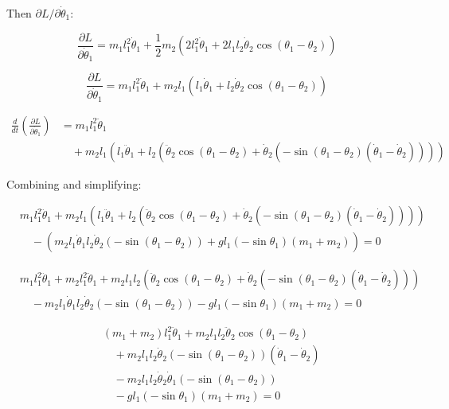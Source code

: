 \documentclass[11pt,a4paper]{article}
\begin{document}
Then $\partial L / \partial \dot{\theta}_1$:

\[ \frac{\partial L}{\partial \dot{\theta}_1} = m_1 l_1^2 \dot{\theta}_1 + \frac{1}{2} m_2 \left( 2 l_1^2 \dot{\theta}_1 + 2 l_1 l_2 \dot{\theta}_2 \cos(\theta_1 - \theta_2) \right) \]

\[ \frac{\partial L}{\partial \dot{\theta}_1} = m_1 l_1^2 \dot{\theta}_1 + m_2 l_1 \left( l_1 \dot{\theta}_1 + l_2 \dot{\theta}_2 \cos(\theta_1 - \theta_2) \right) \]

\begin{align*}
\frac{d}{dt} \left( \frac{\partial L}{\partial \dot{\theta}_1} \right)
  &= m_1 l_1^2 \ddot{\theta}_1 \\
  &\quad + m_2 l_1 \left( l_1 \ddot{\theta}_1 + l_2 \left( \ddot{\theta}_2 \cos(\theta_1 - \theta_2) + \dot{\theta}_2 (-\sin(\theta_1 - \theta_2) (\dot{\theta}_1 - \dot{\theta}_2)) \right) \right)
\end{align*}

Combining and simplifying:

\begin{align*}
& m_1 l_1^2 \ddot{\theta}_1 + m_2 l_1 \left( l_1 \ddot{\theta}_1 + l_2 \left( \ddot{\theta}_2 \cos(\theta_1 - \theta_2) + \dot{\theta}_2 (-\sin(\theta_1 - \theta_2) (\dot{\theta}_1 - \dot{\theta}_2)) \right) \right) \\
&\quad - \left( m_2 l_1 \dot{\theta}_1 l_2 \dot{\theta}_2 (-\sin(\theta_1 - \theta_2)) + g l_1 (-\sin\theta_1) (m_1 + m_2) \right) = 0
\end{align*}

\begin{align*}
& m_1 l_1^2 \ddot{\theta}_1 + m_2 l_1^2 \ddot{\theta}_1 + m_2 l_1 l_2 \left( \ddot{\theta}_2 \cos(\theta_1 - \theta_2) + \dot{\theta}_2 (-\sin(\theta_1 - \theta_2) (\dot{\theta}_1 - \dot{\theta}_2)) \right) \\
&\quad - m_2 l_1 \dot{\theta}_1 l_2 \dot{\theta}_2 (-\sin(\theta_1 - \theta_2)) - g l_1 (-\sin\theta_1) (m_1 + m_2) = 0
\end{align*}

\begin{align*}
& (m_1 + m_2) l_1^2 \ddot{\theta}_1 + m_2 l_1 l_2 \ddot{\theta}_2 \cos(\theta_1 - \theta_2) \\
&\quad + m_2 l_1 l_2 \dot{\theta}_2 (-\sin(\theta_1 - \theta_2)) (\dot{\theta}_1 - \dot{\theta}_2) \\
&\quad - m_2 l_1 l_2 \dot{\theta}_2 \dot{\theta}_1 (-\sin(\theta_1 - \theta_2)) \\
&\quad - g l_1 (-\sin\theta_1) (m_1 + m_2) = 0
\end{align*}
\end{document}
